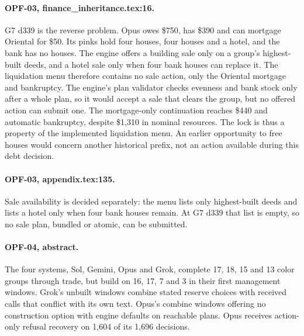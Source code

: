 \paragraph{OPF-03, finance\_inheritance.tex:16.}
G7 d339 is the reverse problem. Opus owes \$750, has \$390 and can mortgage Oriental for \$50. Its pinks hold four houses, four houses and a hotel, and the bank has no houses. The engine offers a building sale only on a group's highest-built deeds, and a hotel sale only when four bank houses can replace it. The liquidation menu therefore contains no sale action, only the Oriental mortgage and bankruptcy. The engine's plan validator checks evenness and bank stock only after a whole plan, so it would accept a sale that clears the group, but no offered action can submit one. The mortgage-only continuation reaches \$440 and automatic bankruptcy, despite \$1,310 in nominal resources. The lock is thus a property of the implemented liquidation menu. An earlier opportunity to free houses would concern another historical prefix, not an action available during this debt decision.

\paragraph{OPF-03, appendix.tex:135.}
Sale availability is decided separately: the menu lists only highest-built deeds and lists a hotel only when four bank houses remain. At G7 d339 that list is empty, so no sale plan, bundled or atomic, can be submitted.


\paragraph{OPF-04, abstract.}
The four systems, Sol, Gemini, Opus and Grok, complete 17, 18, 15 and 13 color groups through trade, but build on 16, 17, 7 and 3 in their first management windows. Grok's unbuilt windows combine stated reserve choices with received calls that conflict with its own text. Opus's combine windows offering no construction option with engine defaults on reachable plans. Opus receives action-only refusal recovery on 1,604 of its 1,696 decisions.

